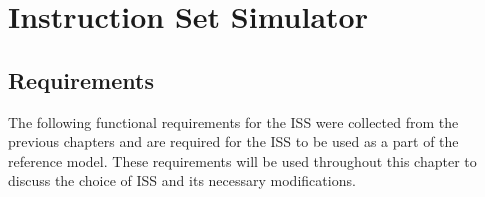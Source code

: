 \chapter{Instruction Set Simulator}
\label{ch:ISS}



\section{Requirements}

The following functional requirements for the ISS were collected from the previous chapters and are required for the ISS to be used as a part of the reference model. These requirements will be used throughout this chapter to discuss the choice of ISS and its necessary modifications. 

